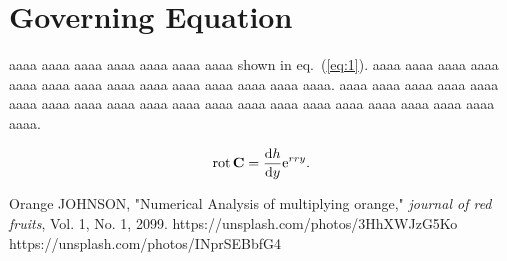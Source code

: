 \documentclass[twocolumn,9pt]{article}
\begin{document}
\section{Governing Equation}
%
%
%
aaaa aaaa aaaa aaaa aaaa aaaa aaaa
shown in eq.~(\ref{eq:1}).
aaaa aaaa aaaa aaaa aaaa aaaa aaaa
aaaa aaaa aaaa aaaa aaaa aaaa aaaa.
aaaa aaaa aaaa aaaa aaaa aaaa aaaa
aaaa aaaa aaaa aaaa aaaa aaaa aaaa
aaaa aaaa aaaa aaaa aaaa aaaa aaaa.

\begin{equation}
    \label{eq:1}
    \operatorname{rot} {\bf C} = \frac{{\rm d} h}{{\rm d} y} {\rm e}^{rry}.
\end{equation}

%
%
%
\begin{thebibliography}{99}
     Orange JOHNSON, "Numerical Analysis of multiplying orange," {\it journal of red fruits}, Vol. 1, No. 1, 2099.
     https://unsplash.com/photos/3HhXWJzG5Ko
     https://unsplash.com/photos/INprSEBbfG4
\end{thebibliography}
%
%
%
%
%
\end{document}
